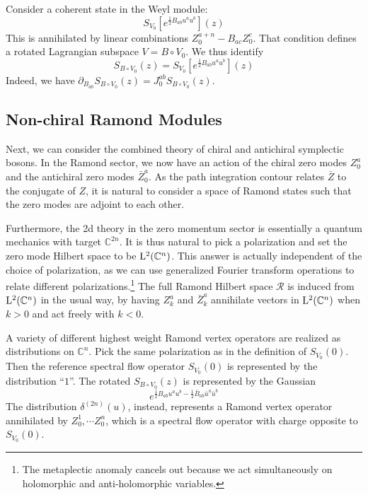 \documentclass[11pt,a4paper]{article}
\begin{document}
Consider a coherent state in the Weyl module:
\begin{equation}
S_{V_0}[e^{\frac12 B_{ab} u^a u^b}](z)
\end{equation}
This is annihilated by linear combinations $Z^{a+n}_0 - B_{ac} Z^c_0$. That condition  defines a rotated 
Lagrangian subspace $V = B \circ V_0$. We thus identify
\begin{equation}
S_{B \circ V_0}(z) = S_{V_0}[e^{\frac12 B_{ab} u^a u^b}](z)
\end{equation}
Indeed, we have $\partial_{B_{ab}}S_{B \circ V_0}(z) = J_0^{ab}S_{B \circ V_0}(z)$. 

\subsection{Non-chiral Ramond Modules}
Next, we can consider the combined theory of chiral and antichiral symplectic bosons. In the Ramond sector, we now have 
an action of the chiral zero modes $Z_0^a$ and the antichiral zero modes $\bar Z_0^a$. As the path integration contour 
relates $\bar Z$ to the conjugate of $Z$, it is natural to consider a space of Ramond states such that the 
zero modes are adjoint to each other. 

Furthermore, the 2d theory in the zero momentum sector is essentially a quantum mechanics with target $\mathbb{C}^{2n}$. 
It is thus natural to pick a polarization and set the zero mode Hilbert space to be ${\mathrm L}^2(\mathbb{C}^{n})$. This answer is actually independent of the choice of polarization, as we can use generalized Fourier transform operations to relate different polarizations.\footnote{The metaplectic anomaly cancels out because we act simultaneously on holomorphic and anti-holomorphic variables.} 
The full Ramond Hilbert space ${\mathcal R}$ is induced from ${\mathrm L}^2(\mathbb{C}^{n})$ in the usual way, by having $Z^a_k$ and $\bar Z^a_k$ annihilate vectors in ${\mathrm L}^2(\mathbb{C}^{n})$ when $k>0$ and act freely with $k<0$. 

A variety of different highest weight Ramond vertex operators are realized as distributions on $\mathbb{C}^{n}$. 
Pick the same polarization as in the definition of $S_{V_0}(0)$. Then the reference spectral flow operator $S_{V_0}(0)$ is represented by the distribution ``$1$''. The rotated $S_{B \circ V_0}(z)$ is represented by the Gaussian
\begin{equation}
e^{\frac12 B_{ab} u^a u^b-\frac12 \bar B_{ab} \bar u^a \bar u^b }
\end{equation}
The distribution $\delta^{(2n)}(u)$, instead, represents a Ramond vertex operator annihilated by $Z^{1}_0, \cdots Z^{n}_0$,
which is a spectral flow operator with charge opposite to $S_{V_0}(0)$.
\end{document}
